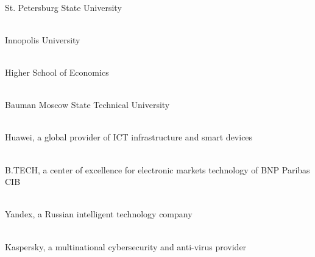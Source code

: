 \cleardoublepage
{}

\newcommand\partner[3]{ \\ #3}

\partner{height=0.7in}{partners/spbu}{St. Petersburg State University}

\partner{height=0.7in}{partners/iu}{Innopolis University}

\partner{height=0.8in}{partners/hse}{Higher School of Economics}

\partner{height=0.8in}{partners/bauman}{Bauman Moscow State Technical University}

\partner{height=0.5in}{partners/huawei}{Huawei, a global provider of ICT infrastructure and smart devices}

\partner{width=0.7in}{partners/bnp}{B.TECH, a center of excellence for electronic markets technology of BNP Paribas CIB}

\partner{width=1.2in}{partners/yandex}{Yandex, a Russian intelligent technology company}

\partner{width=2in}{partners/kaspersky}{Kaspersky, a multinational cybersecurity and anti-virus provider}
